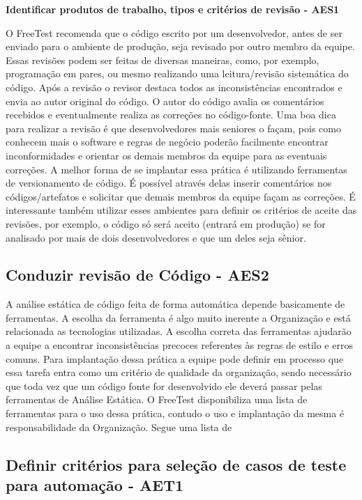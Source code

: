 \textbf{Identificar produtos de trabalho, tipos e critérios de revisão - AES1}

O FreeTest recomenda que o código escrito por um desenvolvedor, antes de ser enviado para o ambiente de produção, seja revisado por outro membro da equipe. Essas revisões podem ser feitas de diversas maneiras, como, por exemplo, programação em pares, ou mesmo realizando uma leitura/revisão sistemática do código. Após a revisão o revisor destaca todos as inconsistências encontrados e envia ao autor original do código. O autor do código avalia os comentários recebidos e eventualmente realiza as correções no código-fonte.
Uma boa dica para realizar a revisão é que desenvolvedores mais seniores o façam, pois como conhecem mais o software e regras de negócio poderão facilmente encontrar inconformidades e orientar os demais membros da equipe para as eventuais correções.
A melhor forma de se implantar essa prática é utilizando ferramentas de versionamento de código. É possível através delas inserir comentários nos códigos/artefatos e solicitar que demais membros da equipe façam as correções. É interessante também utilizar esses ambientes para definir os critérios de aceite das revisões, por exemplo, o código só será aceito (entrará em produção) se for analisado por mais de dois desenvolvedores e que um deles seja sênior.

\subsection{Conduzir revisão de Código - AES2}

A análise estática de código feita de forma automática depende basicamente de ferramentas. A escolha da ferramenta é algo muito inerente a Organização e está relacionada as tecnologias utilizadas. A escolha correta das ferramentas ajudarão a equipe a encontrar inconsistências precoces referentes às regras de estilo e erros comuns.
Para implantação dessa prática a equipe pode definir em processo que essa tarefa entra como um critério de qualidade da organização, sendo necessário que toda vez que um código fonte for desenvolvido ele deverá passar pelas ferramentas de Análise Estática. O FreeTest disponibiliza uma lista de ferramentas para o uso dessa prática, contudo o uso e implantação da mesma é responsabilidade da Organização. Segue uma lista de

\subsection{Definir critérios para seleção de casos de teste para automação - AET1}


